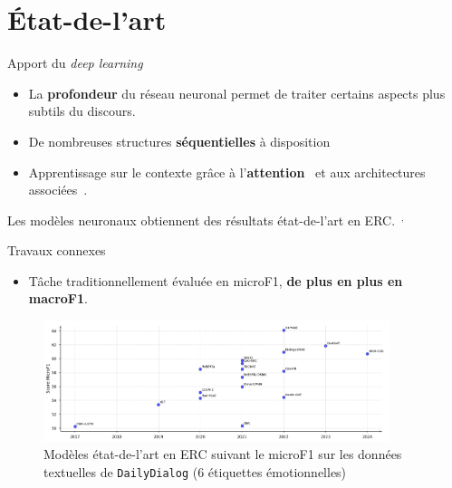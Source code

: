 \documentclass[11pt,aspectratio=169]{beamer}
\begin{document}
\section{État-de-l'art}

\begin{frame}{Apport du \textsl{deep learning}}
    \begin{itemize}
        \item La \textbf{profondeur} du réseau neuronal permet de traiter certains aspects plus subtils du discours. %
        \item De nombreuses structures \textbf{séquentielles} à disposition
        \item Apprentissage sur le contexte grâce à l'\textbf{attention}~ et aux architectures associées~.
    \end{itemize}
    \vspace*{10pt}

Les modèles neuronaux obtiennent des résultats état-de-l'art en ERC.~$^{,}$
\end{frame}

\begin{frame}{Travaux connexes}
    \begin{itemize}
        \item Tâche traditionnellement évaluée en microF1, \textbf{de plus en plus en macroF1}.
    \end{itemize}
    \begin{figure}
        \centering
        \includegraphics[width=0.9\textwidth]{sota-chrono-plot.png}
        \caption{\centering Modèles état-de-l'art en ERC suivant le microF1 sur les données textuelles de \texttt{DailyDialog} (6 étiquettes émotionnelles)}
    \end{figure}
\end{frame}
\end{document}
